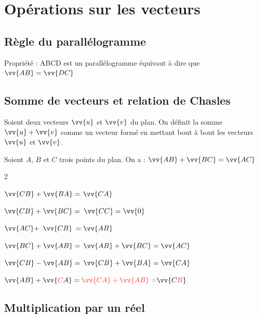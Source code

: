 \documentclass[11pt,a4paper]{article}  %
\begin{document}
\section{Opérations sur les vecteurs}
\subsection{Règle du parallélogramme}

\begin{bprop}
	Propriété : ABCD est un parallélogramme équivaut à dire que $\vv{A B}=\vv{D C}$
\end{bprop}

\subsection{Somme de vecteurs et relation de Chasles}

\begin{bdefi}
	 Soient deux vecteurs $\vv{u}$ et $\vv{v}$ du plan. On définit la somme $\vv{u}+\vv{v}$ comme un vecteur formé en mettant bout à bout les vecteurs $\vv{u}$ et $\vv{v}$.
\end{bdefi}

\begin{bprop}
	 Soient $A$, $B$ et $C$ trois points du plan. On a : $\vv{A B}+\vv{B C}=\vv{A C}$
\end{bprop}

\begin{bexemple}
	\begin{multicols}{2}
		\begin{enumEx}
			\item $\vv{C B}+\vv{B A}=$ \textcolor{red}{$\vv{CA}$}
			\item $\vv{C B}+\vv{B C}=$ \textcolor{red}{$\vv{CC}=\vv{0}$}
			\item $\vv{A C}+$ \textcolor{red}{$\vv{CB}$} $=\vv{A B}$
			\item $\vv{B C}+\vv{A B}=$ \textcolor{red}{$\vv{AB}+\vv{BC}=\vv{AC}$}
			\item $\vv{C B}-\vv{A B}=$ \textcolor{red}{$\vv{CB}+\vv{BA}=\vv{CA}$}
			\item $\vv{A B}+\vv{\mRougeWB{C}A}=\mRougeWB{\vv{CA}+\vv{AB}=}\vv{C\mRougeWB{B}}$
		\end{enumEx}
	\end{multicols}
\end{bexemple}

\subsection{Multiplication par un réel}
\end{document}
